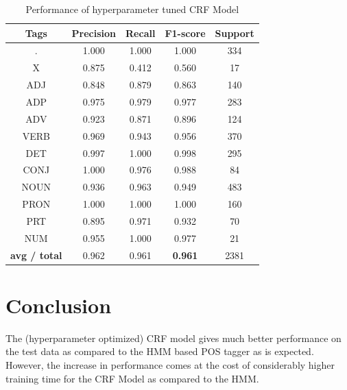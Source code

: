 \documentclass[12pt]{article}
\begin{document}
\begin{table}[h!]
\begin{center}
    \caption{Performance of hyperparameter tuned CRF Model}
    \label{tab:table8}
\begin{tabular}{ c c c c c}
 \textbf{Tags}& \textbf{Precision} & \textbf{Recall} & \textbf{F1-score} & \textbf{Support} \\ 
 \hline

          .   &    1.000 &     1.000  &    1.000  &      334\\ 
          X &      0.875 &     0.412  &    0.560  &       17\\ 
        ADJ   &    0.848 &     0.879  &    0.863  &      140\\ 
        ADP  &     0.975  &    0.979 &     0.977  &      283\\ 
        ADV  &     0.923  &    0.871 &     0.896  &      124\\ 
       VERB  &     0.969  &    0.943  &    0.956  &      370\\ 
        DET  &     0.997  &    1.000  &    0.998  &      295\\ 
       CONJ  &     1.000  &    0.976 &     0.988  &       84\\ 
       NOUN &      0.936  &    0.963 &     0.949  &      483\\ 
       PRON &      1.000  &    1.000 &     1.000  &      160\\ 
        PRT &      0.895  &    0.971 &     0.932  &       70\\ 
        NUM &      0.955  &    1.000 &     0.977  &       21\\ 
\hline
\textbf{avg / total} &    0.962 &     0.961 &      \textbf{0.961}   &    2381

\end{tabular}
\end{center}
\end{table}

\section{Conclusion}
The (hyperparameter optimized) CRF model gives much better performance on the test data as compared to the HMM based POS tagger as is expected. However, the increase in performance comes at the cost of considerably higher training time for the CRF Model as compared to the HMM.
\end{document}

